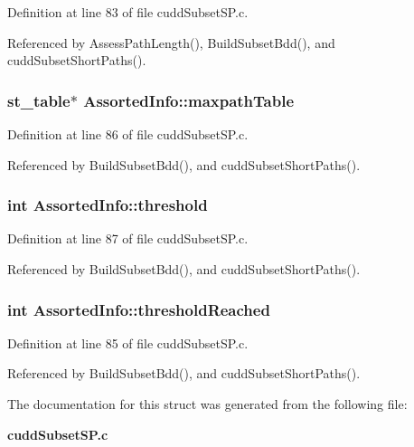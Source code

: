 Definition at line 83 of file cudd\-Subset\-SP.c.

Referenced by Assess\-Path\-Length(), Build\-Subset\-Bdd(), and cudd\-Subset\-Short\-Paths().
\subsubsection{\setlength{\rightskip}{0pt plus 5cm}\bf{st\_\-table}$\ast$ \bf{Assorted\-Info::maxpath\-Table}}\label{structAssortedInfo_bd8827ad32e7ef5665e5270292812b0a}




Definition at line 86 of file cudd\-Subset\-SP.c.

Referenced by Build\-Subset\-Bdd(), and cudd\-Subset\-Short\-Paths().
\subsubsection{\setlength{\rightskip}{0pt plus 5cm}int \bf{Assorted\-Info::threshold}}\label{structAssortedInfo_d9d88623a26d0cacc14bc0eaf41ebda6}




Definition at line 87 of file cudd\-Subset\-SP.c.

Referenced by Build\-Subset\-Bdd(), and cudd\-Subset\-Short\-Paths().
\subsubsection{\setlength{\rightskip}{0pt plus 5cm}int \bf{Assorted\-Info::threshold\-Reached}}\label{structAssortedInfo_85ddb7c3d50d84081723a8442174c87f}




Definition at line 85 of file cudd\-Subset\-SP.c.

Referenced by Build\-Subset\-Bdd(), and cudd\-Subset\-Short\-Paths().

The documentation for this struct was generated from the following file:\begin{CompactItemize}
\item 
\bf{cudd\-Subset\-SP.c}\end{CompactItemize}
